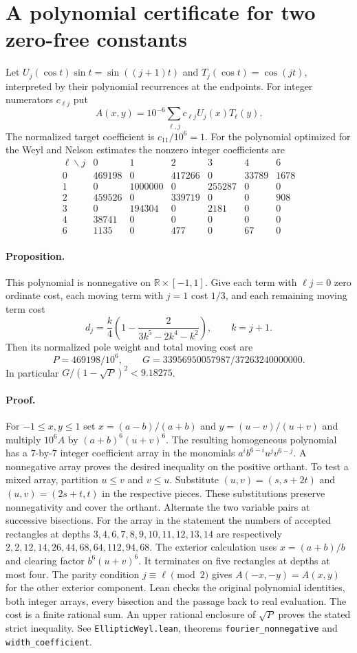 \section{A polynomial certificate for two zero-free constants}
Let $U_j(\cos t)\sin t=\sin((j+1)t)$ and $T_j(\cos t)=\cos(jt)$, interpreted by their polynomial recurrences at the endpoints. For integer numerators $c_{\ell j}$ put
\[
        A(x,y)=10^{-6}\sum_{\ell,j}c_{\ell j}U_j(x)T_\ell(y).
\]
The normalized target coefficient is $c_{11}/10^6=1$. For the polynomial optimized for the Weyl and Nelson estimates the nonzero integer coefficients are
\[
\begin{array}{c|rrrrrr}
 \ell\backslash j&0&1&2&3&4&6\\\hline
 0&469198&0&417266&0&33789&1678\\
 1&0&1000000&0&255287&0&0\\
 2&459526&0&339719&0&0&908\\
 3&0&194304&0&2181&0&0\\
 4&38741&0&0&0&0&0\\
 6&1135&0&477&0&67&0
\end{array}
\]
\paragraph{Proposition.}
This polynomial is nonnegative on $\mathbb R\times[-1,1]$. Give each term with $\ell j=0$ zero ordinate cost, each moving term with $j=1$ cost $1/3$, and each remaining moving term cost
\[
 d_j=\frac{k}{4}\left(1-\frac2{3k^5-2k^4-k^2}\right),\qquad k=j+1 .
\]
Then its normalized pole weight and total moving cost are
\[
 P=469198/10^6,\qquad G=33956950057987/37263240000000 .
\]
In particular $G/(1-\sqrt P)^2<9.18275$.

\paragraph{Proof.}
For $-1\le x,y\le1$ set $x=(a-b)/(a+b)$ and $y=(u-v)/(u+v)$ and multiply $10^6A$ by $(a+b)^6(u+v)^6$. The resulting homogeneous polynomial has a $7$-by-$7$ integer coefficient array in the monomials $a^i b^{6-i}u^jv^{6-j}$. A nonnegative array proves the desired inequality on the positive orthant. To test a mixed array, partition $u\le v$ and $v\le u$. Substitute $(u,v)=(s,s+2t)$ and $(u,v)=(2s+t,t)$ in the respective pieces. These substitutions preserve nonnegativity and cover the orthant. Alternate the two variable pairs at successive bisections. For the array in the statement the numbers of accepted rectangles at depths $3,4,6,7,8,9,10,11,12,13,14$ are respectively $2,2,12,14,26,44,68,64,112,94,68$. The exterior calculation uses $x=(a+b)/b$ and clearing factor $b^6(u+v)^6$. It terminates on five rectangles at depths at most four. The parity condition $j\equiv\ell\pmod2$ gives $A(-x,-y)=A(x,y)$ for the other exterior component. Lean checks the original polynomial identities, both integer arrays, every bisection and the passage back to real evaluation. The cost is a finite rational sum. An upper rational enclosure of $\sqrt P$ proves the stated strict inequality. See \texttt{EllipticWeyl.lean}, theorems \texttt{fourier\_nonnegative} and \texttt{width\_coefficient}.

